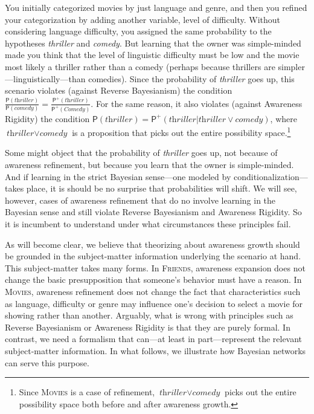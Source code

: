 \documentclass[
  11pt,
  dvipsnames,enabledeprecatedfontcommands]{scrartcl}
\newcommand{\pr}[1]{\ensuremath{\mathsf{P}(#1)}}
\newcommand{\ppr}[2]{\ensuremath{\mathsf{P}^{#1}(#2)}}
\begin{document}
\noindent You initially categorized movies by just language and genre,
and then you refined your categorization by adding another variable,
level of difficulty. Without considering language difficulty, you
assigned the same probability to the hypotheses \textit{thriller} and
\textit{comedy}. But learning that the owner was simple-minded made you
think that the level of linguistic difficulty must be low and the movie
most likely a thriller rather than a comedy (perhaps because thrillers
are simpler---linguistically---than comedies). Since the probability of
\textit{thriller} goes up, this scenario violates (against Reverse
Bayesianism) the condition
\(\frac{\pr{\textit{thriller}}}{\pr{\textit{comedy}}}=\frac{\ppr{+}{\textit{thriller}}}{\ppr{+}{\textit{Comedy}}}\).
For the same reason, it also violates (against Awareness Rigidity) the
condition
\(\pr{\textit{thriller}}=\ppr{+}{\textit{thriller} \vert \textit{thriller}\vee \textit{comedy}}\),
where \(\textit{thriller}\vee \textit{comedy}\) is a proposition that
picks out the entire possibility space.\footnote{Since \textsc{Movies}
  is a case of refinement, \(\textit{thriller}\vee \textit{comedy}\)
  picks out the entire possibility space both before and after awareness
  growth.}

Some might object that the probability of \textit{thriller} goes up, not
because of awareness refinement, but because you learn that the owner is
simple-minded. And if learning in the strict Bayesian sense---one
modeled by conditionalization---takes place, it is should be no surprise
that probabilities will shift. We will see, however, cases of awareness
refinement that do no involve learning in the Bayesian sense and still
violate Reverse Bayesianism and Awareness Rigidity. So it is incumbent
to understand under what circumstances these principles fail.

As will become clear, we believe that theorizing about awareness growth
should be grounded in the subject-matter information underlying the
scenario at hand. This subject-matter takes many forms. In
\textsc{Friends}, awareness expansion does not change the basic
presupposition that someone's behavior must have a reason. In
\textsc{Movies}, awareness refinement does not change the fact that
characteristics such as language, difficulty or genre may influence
one's decision to select a movie for showing rather than another.
Arguably, what is wrong with principles such as Reverse Bayesianism or
Awareness Rigidity is that they are purely formal. In contrast, we need
a formalism that can---at least in part---represent the relevant
subject-matter information. In what follows, we illustrate how Bayesian
networks can serve this purpose.
\end{document}

